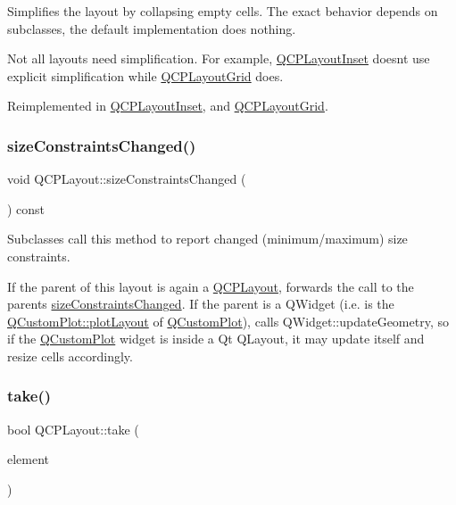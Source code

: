 Simplifies the layout by collapsing empty cells. The exact behavior depends on subclasses, the default implementation does nothing.

Not all layouts need simplification. For example, \hyperlink{classQCPLayoutInset}{Q\+C\+P\+Layout\+Inset} doesn\textquotesingle{}t use explicit simplification while \hyperlink{classQCPLayoutGrid}{Q\+C\+P\+Layout\+Grid} does. 

Reimplemented in \hyperlink{classQCPLayoutInset_a18b7d508f0baa60cc5dcb1343cf7f32a}{Q\+C\+P\+Layout\+Inset}, and \hyperlink{classQCPLayoutGrid_a38621ca7aa633b6a9a88617df7f08672}{Q\+C\+P\+Layout\+Grid}.

\mbox{\label{classQCPLayout_aeac66a292f65cf7f8adf94eb92345b3e}} 
\subsubsection{\texorpdfstring{size\+Constraints\+Changed()}{sizeConstraintsChanged()}}
{\footnotesize\ttfamily void Q\+C\+P\+Layout\+::size\+Constraints\+Changed (\begin{DoxyParamCaption}{ }\end{DoxyParamCaption}) const\hspace{0.3cm}{\ttfamily [protected]}}

Subclasses call this method to report changed (minimum/maximum) size constraints.

If the parent of this layout is again a \hyperlink{classQCPLayout}{Q\+C\+P\+Layout}, forwards the call to the parent\textquotesingle{}s \hyperlink{classQCPLayout_aeac66a292f65cf7f8adf94eb92345b3e}{size\+Constraints\+Changed}. If the parent is a Q\+Widget (i.\+e. is the \hyperlink{classQCustomPlot_af1a1f1f571237deb7c2bd34a5e9f018f}{Q\+Custom\+Plot\+::plot\+Layout} of \hyperlink{classQCustomPlot}{Q\+Custom\+Plot}), calls Q\+Widget\+::update\+Geometry, so if the \hyperlink{classQCustomPlot}{Q\+Custom\+Plot} widget is inside a Qt Q\+Layout, it may update itself and resize cells accordingly. \mbox{\label{classQCPLayout_ada26cd17e56472b0b4d7fbbc96873e4c}} 
\subsubsection{\texorpdfstring{take()}{take()}}
{\footnotesize\ttfamily bool Q\+C\+P\+Layout\+::take (\begin{DoxyParamCaption}\item[{\hyperlink{classQCPLayoutElement}{Q\+C\+P\+Layout\+Element} $\ast$}]{element }\end{DoxyParamCaption})\hspace{0.3cm}{\ttfamily [pure virtual]}}

